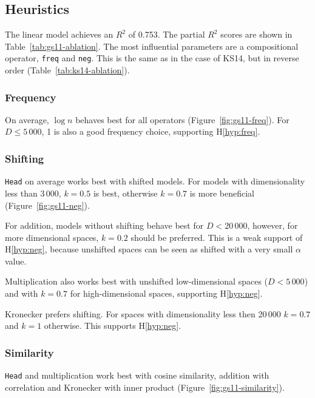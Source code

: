 \subsection{Heuristics}
\label{sec:heuristics-gs11}

The linear model achieves an $R^2$ of 0.753. The partial $R^2$ scores are shown in Table~\ref{tab:gs11-ablation}. The most influential parameters are a compositional operator, \texttt{freq} and \texttt{neg}. This is the same as in the case of KS14, but in reverse order (Table~\ref{tab:ks14-ablation}).

\subsubsection{Frequency}




On average, $\log n$ behaves best for all operators (Figure~\ref{fig:gs11-freq}). For $D \leq 5\,000$, 1 is also a good frequency choice, supporting H\ref{hyp:freq}.

\subsubsection{Shifting}

\texttt{Head} on average works best with shifted models. For models with dimensionality less than 3\,000, $k = 0.5$ is best, otherwise $k = 0.7$ is more beneficial (Figure~\ref{fig:gs11-neg}).

For addition, models without shifting behave best for $D < 20\,000$, however, for more dimensional spaces, $k = 0.2$ should be preferred. This is a weak support of H\ref{hyp:neg}, because unshifted spaces can be seen as shifted with a very small $\alpha$ value.

Multiplication also works best with unshifted low-dimensional spaces ($D < 5\,000$) and with $k = 0.7$ for high-dimensional spaces, supporting H\ref{hyp:neg}.

Kronecker prefers shifting. For spaces with dimensionality less then 20\,000 $k = 0.7$ and $k = 1$ otherwise. This supports H\ref{hyp:neg}.

\subsubsection{Similarity}



\texttt{Head} and multiplication work best with cosine similarity, addition with correlation and Kronecker with inner product (Figure~\ref{fig:gs11-similarity}).

